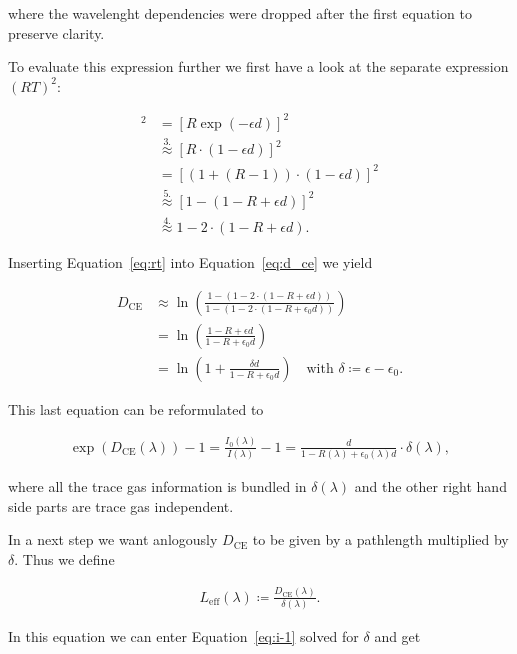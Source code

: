 where the wavelenght dependencies were dropped after the first
equation to preserve clarity. 

To evaluate this expression further we
first have a look at the separate expression $(RT)^2$:

\begin{align}
  [RT]^2 & = [R \exp(-\epsilon d)]^2 \nonumber\\
         & \stackrel{3.}{\approx} [R \cdot(1 - \epsilon d)]^2 \nonumber\\
         & = [(1 + (R - 1))\cdot (1 - \epsilon d)]^2 \nonumber\\
         & \stackrel{5.}{\approx} [1 - (1 - R + \epsilon d)]^2 \nonumber\\
         & \stackrel{4.}{\approx} 1 - 2 \cdot (1 - R + \epsilon d)\label{eq:rt}.
\end{align}

Inserting Equation~\eqref{eq:rt} into Equation~\eqref{eq:d_ce} we
yield

\begin{align}
  D_{\text{CE}} & \approx \ln \left ( \frac{1 - (1 - 2\cdot ( 1- R +
  \epsilon d))}{1 - (1 - 2 \cdot (1 - R + \epsilon_0 d))}\right)\\
  & = \ln \left ( \frac{1 - R + \epsilon d}{1 - R + \epsilon_0
    d}\right) \\
  & = \ln \left ( 1 + \frac{ \delta d}{1 - R + \epsilon_0 d}\right) \quad
    \text{with } \delta \coloneqq \epsilon - \epsilon_0.
\end{align}

This last equation can be reformulated to

\begin{align}
  \exp(D_{\text{CE}}(\lambda)) - 1 = \frac{I_0(\lambda)}{I(\lambda)} -
  1 = \frac{d}{1 - R(\lambda) + \epsilon_0(\lambda) d} \cdot
  \delta(\lambda)\label{eq:i-1}, 
\end{align}

where all the trace gas information is bundled in $\delta(\lambda)$
and the other right hand side parts are trace gas independent.

In a next step we want anlogously $D_{\text{CE}}$ to be given by a
pathlength multiplied by $\delta$. Thus we define

\begin{align}
  L_{\text{eff}}(\lambda) \coloneqq \frac{D_{\text{CE}}(\lambda)}{\delta(\lambda)}.
\end{align}

In this equation we can enter Equation~\ref{eq:i-1} solved for
$\delta$ and get

